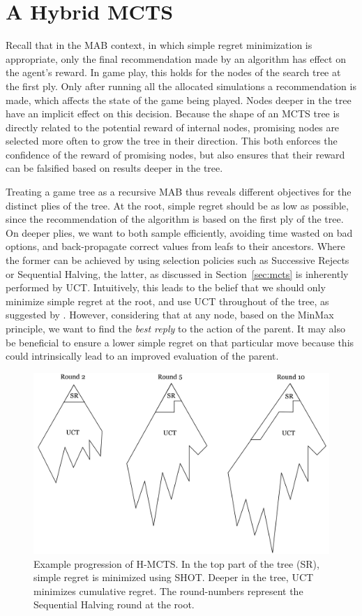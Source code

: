 \documentclass[a4paper]{llncs}
\begin{document}
\section{A Hybrid MCTS}
\label{sec:h-mcts}

Recall that in the MAB context, in which simple regret minimization is appropriate, only the final recommendation made by an algorithm has effect on the agent's reward. In game play, this holds for the nodes of the search tree at the first ply. Only after running all the allocated simulations a recommendation is made, which affects the state of the game being played. Nodes deeper in the tree have an implicit effect on this decision. Because the shape of an MCTS tree is directly related to the potential reward of internal nodes, promising nodes are selected more often to grow the tree in their direction. This both enforces the confidence of the reward of promising nodes, but also ensures that their reward can be falsified based on results deeper in the tree.

Treating a game tree as a recursive MAB thus reveals different objectives for the distinct plies of the tree. At the root, simple regret should be as low as possible, since the recommendation of the algorithm is based on the first ply of the tree. On deeper plies, we want to both sample efficiently, avoiding time wasted on bad options, and back-propagate correct values from leafs to their ancestors. Where the former can be achieved by using selection policies such as Successive Rejects or Sequential Halving, the latter, as discussed in Section~\ref{sec:mcts} is inherently performed by UCT. Intuitively, this leads to the belief that we should only minimize simple regret at the root, and use UCT throughout of the tree, as suggested by \cite{tolpin2012mcts}.
However, considering that at any node, based on the MinMax principle, we want to find the \emph{best reply} to the action of the parent. It may also be beneficial to ensure a lower simple regret on that particular move because this could intrinsically lead to an improved evaluation of the parent.

\begin{figure}[t!]
	\centering
	\includegraphics[width=.75\textwidth]{img/H-MCTS.png}
	\caption{Example progression of H-MCTS. In the top part of the tree (SR), simple regret is minimized using SHOT. Deeper in the tree, UCT minimizes cumulative regret. The round-numbers represent the Sequential Halving round at the root.}
	\label{fig:h-mcts_trees}
\end{figure}
\end{document}
